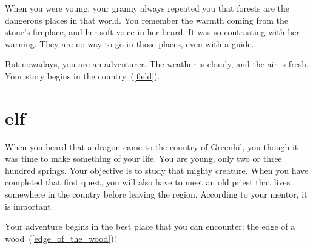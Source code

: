 When you were young, your granny always repeated you that forests are the
dangerous places in that world. You remember the warmth coming from the
stone's fireplace, and her soft voice in her beard. It was so contrasting with
her warning. They are no way to go in those places, even with a guide.

But nowadays, you are an adventurer. The weather is cloudy, and the air is
fresh. Your story begins in the country~(\ref{field}).

\section{elf}

When you heard that a dragon came to the country of Greenhil, you though it was
time to make something of your life. You are young, only two or three hundred
springs. Your objective is to study that mighty creature. When you have
completed that first quest, you will also have to meet an old priest that lives
somewhere in the country before leaving the region. According to your mentor, it
is important.

Your adventure begins in the best place that you can encounter: the edge of a
wood~(\ref{edge_of_the_wood})!

